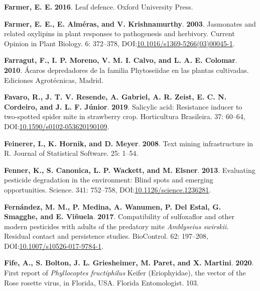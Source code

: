 \documentclass[12pt,final,CPage]{ufthesis}
\newlength{\cslhangindent}
\newenvironment{CSLReferences}[2] %
{%
	\setlength{\parindent}{0pt}
	\ifodd #1 \everypar{\setlength{\hangindent}{\cslhangindent}}\ignorespaces\fi
	\ifnum #2 > 0
	\setlength{\parskip}{#2\baselineskip}
	\fi
}%
{}
\begin{document}
{\begin{CSLReferences}{1}{0}
  \leavevmode{}%
  \textbf{Farmer, E. E.} \textbf{2016}. Leaf defence. Oxford University Press.

  \leavevmode{}%
  \textbf{Farmer, E. E., E. Alméras, and V. Krishnamurthy}. \textbf{2003}. Jasmonates and related oxylipins in plant responses to pathogenesis and herbivory. Current Opinion in Plant Biology. 6: 372--378, DOI:\href{https://doi.org/10.1016/s1369-5266(03)00045-1}{10.1016/s1369-5266(03)00045-1}.

  \leavevmode{}%
  \textbf{Farragut, F., I. P. Moreno, V. M. I. Calvo, and L. A. E. Colomar}. \textbf{2010}. {Á}caros depredadores de la familia {Phytoseiidae} en las plantas cultivadas. Ediciones Agrot{é}cnicas, Madrid.

  \leavevmode{}%
  \textbf{Favaro, R., J. T. V. Resende, A. Gabriel, A. R. Zeist, E. C. N. Cordeiro, and J. L. F. Júnior}. \textbf{2019}. Salicylic acid: Resistance inducer to two-spotted spider mite in strawberry crop. Horticultura Brasileira. 37: 60--64, DOI:\href{https://doi.org/10.1590/s0102-053620190109}{10.1590/s0102-053620190109}.

  \leavevmode{}%
  \textbf{Feinerer, I., K. Hornik, and D. Meyer}. \textbf{2008}. Text mining infrastructure in {R}. Journal of Statistical Software. 25: 1--54.

  \leavevmode{}%
  \textbf{Fenner, K., S. Canonica, L. P. Wackett, and M. Elsner}. \textbf{2013}. Evaluating pesticide degradation in the environment: Blind spots and emerging opportunities. Science. 341: 752--758, DOI:\href{https://doi.org/10.1126/science.1236281}{10.1126/science.1236281}.

  \leavevmode{}%
  \textbf{Fernández, M. M., P. Medina, A. Wanumen, P. Del Estal, G. Smagghe, and E. Viñuela}. \textbf{2017}. Compatibility of sulfoxaflor and other modern pesticides with adults of the predatory mite {\emph{Amblyseius swirskii}}. Residual contact and persistence studies. {BioControl}. 62: 197--208, DOI:\href{https://doi.org/10.1007/s10526-017-9784-1}{10.1007/s10526-017-9784-1}.

  \leavevmode{}%
  \textbf{Fife, A., S. Bolton, J. L. Griesheimer, M. Paret, and X. Martini}. \textbf{2020}. First report of {\emph{Phyllocoptes fructiphilus}} {Keifer} ({Eriophyidae}), the vector of the {Rose rosette virus}, in {Florida}, {USA}. Florida Entomologist. 103.


\end{CSLReferences}}
\end{document}
